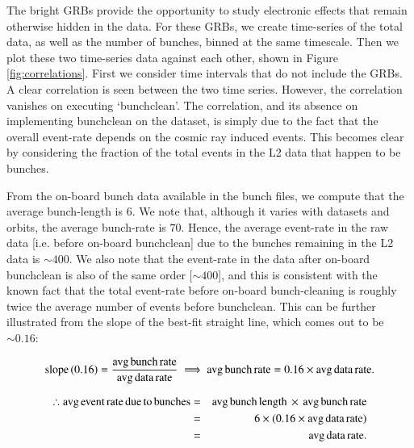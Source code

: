 The bright GRBs provide the opportunity to study electronic effects that remain otherwise hidden in the data. For these GRBs, we create time-series of the total data, as well as the number of bunches, binned at the same timescale. Then we plot these two time-series data against each other, shown in Figure \ref{fig:correlations}. First we consider time intervals that do not include the GRBs. A clear correlation is seen between the two time series. However, the correlation vanishes on executing `bunchclean'. The correlation, and its absence on implementing bunchclean on the dataset, is simply due to the fact that the overall event-rate depends on the cosmic ray induced events. This becomes clear by considering the fraction of the total events in the L2 data that happen to be bunches.

From the on-board bunch data available in the bunch files, we compute that the average bunch-length is $6$. We note that, although it varies with datasets and orbits, the average bunch-rate is $70$. Hence, the average event-rate in the raw data [i.e. before on-board bunchclean] due to the bunches remaining in the L2 data is $\sim 400$. We also note that the event-rate in the data after on-board bunchclean is also of the same order [$\sim 400$], and this is consistent with the known fact that the total event-rate before on-board bunch-cleaning is roughly twice the average number of events before bunchclean. This can be further illustrated from the slope of the best-fit straight line, which comes out to be $\sim 0.16$:

\begin{eqnarray*}
{\rm slope} \, (0.16) = \dfrac{{\rm avg\, bunch\, rate}}{{\rm avg\, data\, rate}} \implies {\rm avg\, bunch\, rate} = 0.16 \times {\rm avg\, data\, rate}.
\end{eqnarray*}

\begin{eqnarray*}
\therefore {\rm avg\, event\, rate\, due\, to\, bunches} & = & {\rm avg\, bunch\, length \,} \times {\, \rm avg\, bunch\, rate} \\
 & = & 6 \times ( 0.16 \times {\rm avg\, data\, rate}) \\
 & = & {\rm avg\, data\, rate}.
\end{eqnarray*}

